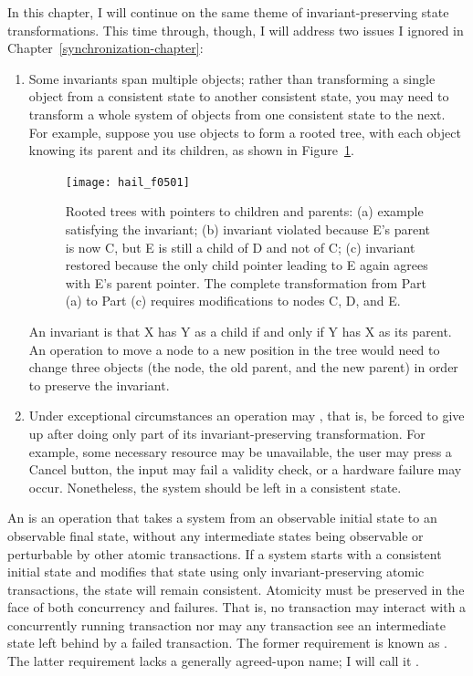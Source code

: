 In this chapter, I will continue on the same theme of
invariant-preserving state transformations.  This time through,
though, I will address two issues I ignored in
Chapter~\ref{synchronization-chapter}:
\begin{enumerate}
\item
Some invariants span multiple objects; rather than transforming a
single object from a consistent state to another consistent state, you may
need to transform a whole system of objects from one consistent state
to the next.  For example, suppose you use objects to form a rooted
tree, with each object knowing its parent and its children, as shown
in Figure~\ref{scan-5-1}.
\begin{figure}
\centerline{\texttt{[image: hail\_f0501]}}
\caption{Rooted trees with pointers to children and parents: (a)
  example satisfying the invariant; (b) invariant violated because
  E's parent is now C, but E is still a child of D and not of C;
  (c) invariant restored because the only child pointer leading to E
  again agrees with E's parent pointer.  The complete transformation
  from Part (a) to Part (c) requires modifications to nodes C, D, and E.}
\label{scan-5-1}
\end{figure}
An
invariant is that X has Y as a child if and only if Y has X as its
parent.  An operation to move a node to a new position in the tree
would need to change three objects (the node, the old parent, and the
new parent) in order to preserve the invariant.
\item
Under exceptional circumstances an operation may , that is,
be forced to give up after doing only part of its invariant-preserving
transformation.  For example, some necessary resource may be
unavailable, the user may press a Cancel button, the input may fail a
validity check, or a hardware failure may occur.  Nonetheless, the
system should be left in a consistent state.
\end{enumerate}

An  is an operation that takes a system
from an observable initial state to an observable final state, without
any intermediate states being observable or perturbable by other
atomic transactions.  If a system starts with a consistent initial
state and modifies that state using only invariant-preserving
atomic transactions, the state will remain consistent.
Atomicity must be preserved in the face of both
concurrency and failures.  That is, no transaction may interact with a
concurrently running transaction nor may any transaction see an
intermediate state left behind by a failed transaction.  The former
requirement is known as .  The latter requirement
lacks a generally agreed-upon name; I will call it .

